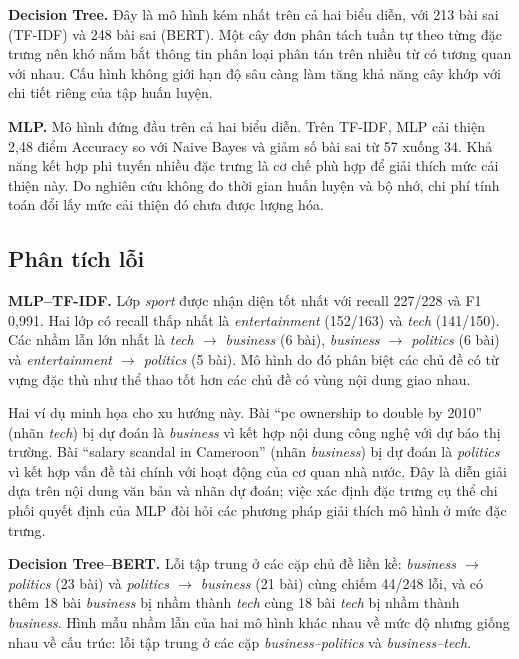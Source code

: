 \documentclass[conference,a4paper]{IEEEtran}
\begin{document}
\textbf{Decision Tree.} Đây là mô hình kém nhất trên cả hai biểu diễn, với 213 bài sai (TF-IDF) và 248 bài sai (BERT). Một cây đơn phân tách tuần tự theo từng đặc trưng nên khó nắm bắt thông tin phân loại phân tán trên nhiều từ có tương quan với nhau. Cấu hình không giới hạn độ sâu càng làm tăng khả năng cây khớp với chi tiết riêng của tập huấn luyện.

\textbf{MLP.} Mô hình đứng đầu trên cả hai biểu diễn. Trên TF-IDF, MLP cải thiện 2,48 điểm Accuracy so với Naive Bayes và giảm số bài sai từ 57 xuống 34. Khả năng kết hợp phi tuyến nhiều đặc trưng là cơ chế phù hợp để giải thích mức cải thiện này. Do nghiên cứu không đo thời gian huấn luyện và bộ nhớ, chi phí tính toán đổi lấy mức cải thiện đó chưa được lượng hóa.

\subsection{Phân tích lỗi}

\textbf{MLP--TF-IDF.} Lớp \textit{sport} được nhận diện tốt nhất với recall 227/228 và F1 0,991. Hai lớp có recall thấp nhất là \textit{entertainment} (152/163) và \textit{tech} (141/150). Các nhầm lẫn lớn nhất là \textit{tech $\rightarrow$ business} (6 bài), \textit{business $\rightarrow$ politics} (6 bài) và \textit{entertainment $\rightarrow$ politics} (5 bài). Mô hình do đó phân biệt các chủ đề có từ vựng đặc thù như thể thao tốt hơn các chủ đề có vùng nội dung giao nhau.

Hai ví dụ minh họa cho xu hướng này. Bài ``pc ownership to double by 2010'' (nhãn \textit{tech}) bị dự đoán là \textit{business} vì kết hợp nội dung công nghệ với dự báo thị trường. Bài ``salary scandal in Cameroon'' (nhãn \textit{business}) bị dự đoán là \textit{politics} vì kết hợp vấn đề tài chính với hoạt động của cơ quan nhà nước. Đây là diễn giải dựa trên nội dung văn bản và nhãn dự đoán; việc xác định đặc trưng cụ thể chi phối quyết định của MLP đòi hỏi các phương pháp giải thích mô hình ở mức đặc trưng.

\textbf{Decision Tree--BERT.} Lỗi tập trung ở các cặp chủ đề liền kề: \textit{business $\rightarrow$ politics} (23 bài) và \textit{politics $\rightarrow$ business} (21 bài) cùng chiếm 44/248 lỗi, và có thêm 18 bài \textit{business} bị nhầm thành \textit{tech} cùng 18 bài \textit{tech} bị nhầm thành \textit{business}. Hình mẫu nhầm lẫn của hai mô hình khác nhau về mức độ nhưng giống nhau về cấu trúc: lỗi tập trung ở các cặp \textit{business--politics} và \textit{business--tech}.
\end{document}
